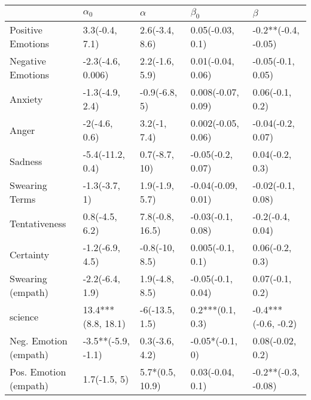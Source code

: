 \begin{tabular}{lllll}
\toprule
{} &          $\alpha_0$ &         $\alpha$ &           $\beta_0$ &              $\beta$ \\
\midrule
Positive Emotions     &      3.3(-0.4, 7.1) &   2.6(-3.4, 8.6) &    0.05(-0.03, 0.1) &  -0.2**(-0.4, -0.05) \\
Negative Emotions     &   -2.3(-4.6, 0.006) &   2.2(-1.6, 5.9) &   0.01(-0.04, 0.06) &    -0.05(-0.1, 0.05) \\
Anxiety               &     -1.3(-4.9, 2.4) &    -0.9(-6.8, 5) &  0.008(-0.07, 0.09) &      0.06(-0.1, 0.2) \\
Anger                 &       -2(-4.6, 0.6) &     3.2(-1, 7.4) &  0.002(-0.05, 0.06) &    -0.04(-0.2, 0.07) \\
Sadness               &    -5.4(-11.2, 0.4) &    0.7(-8.7, 10) &   -0.05(-0.2, 0.07) &      0.04(-0.2, 0.3) \\
Swearing Terms        &       -1.3(-3.7, 1) &   1.9(-1.9, 5.7) &  -0.04(-0.09, 0.01) &    -0.02(-0.1, 0.08) \\
Tentativeness         &      0.8(-4.5, 6.2) &  7.8(-0.8, 16.5) &   -0.03(-0.1, 0.08) &     -0.2(-0.4, 0.04) \\
Certainty             &     -1.2(-6.9, 4.5) &   -0.8(-10, 8.5) &    0.005(-0.1, 0.1) &      0.06(-0.2, 0.3) \\
Swearing (empath)     &     -2.2(-6.4, 1.9) &   1.9(-4.8, 8.5) &   -0.05(-0.1, 0.04) &      0.07(-0.1, 0.2) \\
science               &  13.4***(8.8, 18.1) &   -6(-13.5, 1.5) &    0.2***(0.1, 0.3) &  -0.4***(-0.6, -0.2) \\
Neg. Emotion (empath) &  -3.5**(-5.9, -1.1) &   0.3(-3.6, 4.2) &     -0.05*(-0.1, 0) &     0.08(-0.02, 0.2) \\
Pos. Emotion (empath) &        1.7(-1.5, 5) &  5.7*(0.5, 10.9) &    0.03(-0.04, 0.1) &  -0.2**(-0.3, -0.08) \\
\bottomrule
\end{tabular}
